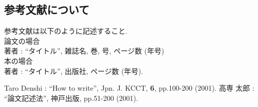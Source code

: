 \documentclass{jarticle}
\begin{document}
\subsection{参考文献について}
参考文献は以下のように記述すること. 
\\
論文の場合\\
著者 : ``タイトル'', 雑誌名, 巻, 号, ページ数 (年号)\\
本の場合\\
著者 : ``タイトル'', 出版社, ページ数 (年号).\\

\begin{thebibliography}{99}%
Taro Denshi : ``How to write'', Jpn. J. KCCT,
 \textbf{6}, pp.100-200 (2001). 
高専 太郎 : ``論文記述法'', 神戸出版, pp.51-200 (2001). 
\end{thebibliography}
\end{document}
